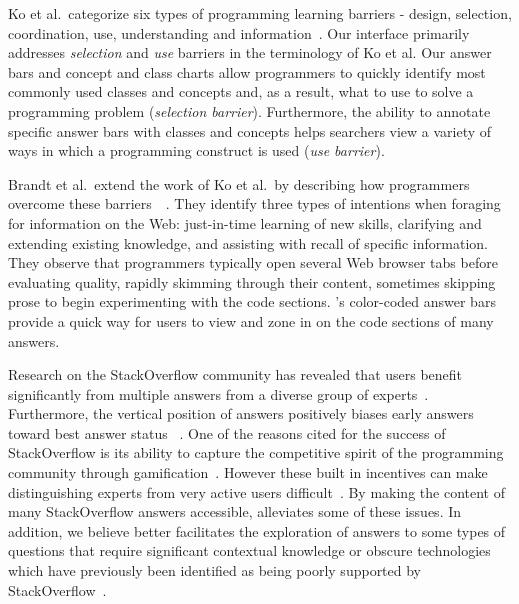 Ko et al.\ categorize six types of programming learning barriers - design, selection, coordination, use, understanding and information~\cite{ko_six_2004}. 
Our \systemname{} interface primarily addresses \emph{selection} and \emph{use} barriers in the terminology of Ko et al. 
Our answer bars and concept and class charts allow programmers to quickly identify most commonly used classes and concepts and, as a result, what to use to solve a programming problem (\emph{selection barrier}).
Furthermore, the ability to annotate specific answer bars with classes and concepts helps searchers view a variety of ways in which a programming construct is used (\emph{use barrier}).

Brandt et al.\ extend the work of Ko et al.\ by describing how programmers overcome these barriers~\cite{brandt_two_2009}~\cite{ko_six_2004}. 
They identify three types of intentions when foraging for information on the Web: just-in-time learning of new skills, clarifying and extending existing knowledge, and assisting with recall of specific information.
They observe that programmers typically open several Web browser tabs before evaluating quality, rapidly skimming through their content, sometimes skipping prose to begin experimenting with the code sections. 
\systemname{}'s color-coded answer bars provide a quick way for users to view and zone in on the code sections of many answers.

Research on the StackOverflow community has revealed that users benefit significantly from multiple answers from a diverse group of experts~\cite{anderson_discovering_2012}. 
Furthermore, the vertical position of answers positively biases early answers toward best answer status ~\cite{anderson_discovering_2012}.
One of the reasons cited for the success of StackOverflow is its ability to capture the competitive spirit of the programming community through gamification~\cite{mamykina_design_2011-1}.
However these built in incentives can make distinguishing experts from very active users difficult~\cite{yang_sparrows_2014}. 
By making the content of many StackOverflow answers accessible, \systemname{} alleviates some of these issues. 
In addition, we believe \systemname{} better facilitates the exploration of answers to some types of questions that require significant contextual knowledge or obscure technologies which have previously been identified as being poorly supported by StackOverflow~\cite{mamykina_design_2011-1}.